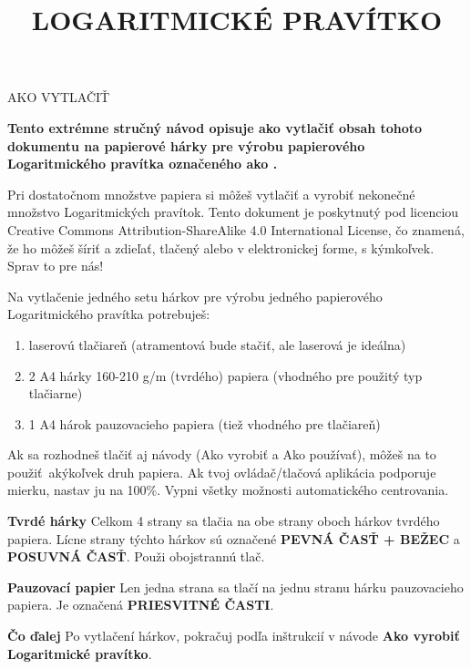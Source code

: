 
\newcommand{\makefulltitle}{Ako vytlačiť Logaritmické pravítko }



\title{\fontsize{60}{60}\selectfont LOGARITMICKÉ PRAVÍTKO}
\preauthor{}\postauthor{}\author{}
\predate{}\postdate{}\date{}


  \begin{center}
    \headingfont\fontsize{20}{20}\selectfont AKO VYTLAČIŤ
  \end{center}

  {\let\newpage\relax\maketitle}%
  \nosection{}
  \large\textbf{\makeperex Tento extrémne stručný návod opisuje ako vytlačiť obsah tohoto dokumentu na papierové hárky pre výrobu papierového Logaritmického pravítka označeného ako \modelname.}

  \begin{multicols*}{3}
  \normalsize{

  Pri dostatočnom množstve papiera si môžeš vytlačiť a vyrobiť nekonečné množstvo Logaritmických pravítok. Tento dokument je poskytnutý pod licenciou Creative Commons Attribution-ShareAlike 4.0 International License, čo znamená, že ho môžeš šíriť a zdieľať, tlačený alebo v elektronickej forme, s kýmkoľvek. Sprav to pre nás!

  Na vytlačenie jedného setu hárkov pre výrobu jedného papierového Logaritmického pravítka potrebuješ:
    \begin{enumerate}
      \setlength{\parskip}{0pt}
      \setlength{\parsep}{0pt}
      \item laserovú tlačiareň (atramentová bude stačiť, ale laserová je ideálna)
      \item 2 A4 hárky 160-210 g/m (tvrdého) papiera (vhodného pre použitý typ tlačiarne)
      \item 1 A4 hárok pauzovacieho papiera (tiež vhodného pre tlačiareň)
    \end{enumerate}

  Ak sa rozhodneš tlačiť aj návody (Ako vyrobiť a Ako používať), môžeš na to použiť akýkoľvek druh papiera. Ak tvoj ovládač/tlačová aplikácia podporuje mierku, nastav ju na 100\%. Vypni všetky možnosti automatického centrovania.

  \textbf{Tvrdé hárky}
Celkom 4 strany sa tlačia na obe strany oboch hárkov tvrdého papiera. Lícne strany týchto hárkov sú označené \textbf{PEVNÁ ČASŤ + BEŽEC} a \textbf{POSUVNÁ ČASŤ}. Použi obojstrannú tlač.

  \textbf{Pauzovací papier}
Len jedna strana sa tlačí na jednu stranu hárku pauzovacieho papiera. Je označená \textbf{PRIESVITNÉ ČASTI}.

  \textbf{Čo ďalej}
Po vytlačení hárkov, pokračuj podľa inštrukcií v návode \textbf{Ako vyrobiť Logaritmické pravítko}.

  }
  \end{multicols*}
  

